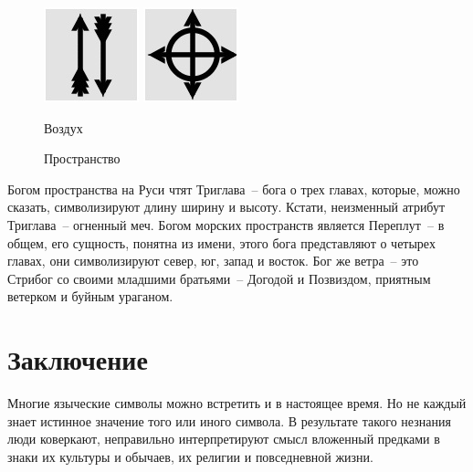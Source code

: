 \documentclass[pscyr,chapters]{hedwork}
\begin{document}
  \begin{figure}[ht]
    \center
    \includegraphics{sl_8_1} \hspace{6em}
    \includegraphics{sl_8_2} \\
    \parbox{11em}{\caption{Воздух}\label{pic-air}} \hspace{1em}
    \parbox{11em}{\caption{Пространство}\label{pic-space}}
  \end{figure}

  Богом пространства на Руси чтят Триглава~-- бога о трех главах, которые, можно
  сказать, символизируют длину ширину и высоту. Кстати, неизменный атрибут
  Триглава~-- огненный меч. Богом морских
  пространств является Переплут~-- в общем, его сущность, понятна из имени,
  этого бога представляют о четырех главах, они символизируют север, юг, запад и
  восток. Бог же ветра~-- это Стрибог со своими младшими братьями~-- Догодой и
  Позвиздом, приятным ветерком и буйным ураганом.

  \chapter*{Заключение}

  Многие языческие символы можно встретить и в настоящее время. Но не каждый
  знает истинное значение того или иного символа. В результате такого незнания
  люди коверкают, неправильно интерпретируют смысл вложенный предками в знаки их
  культуры и обычаев, их религии и повседневной жизни.

  \pagebreak
\end{document}
